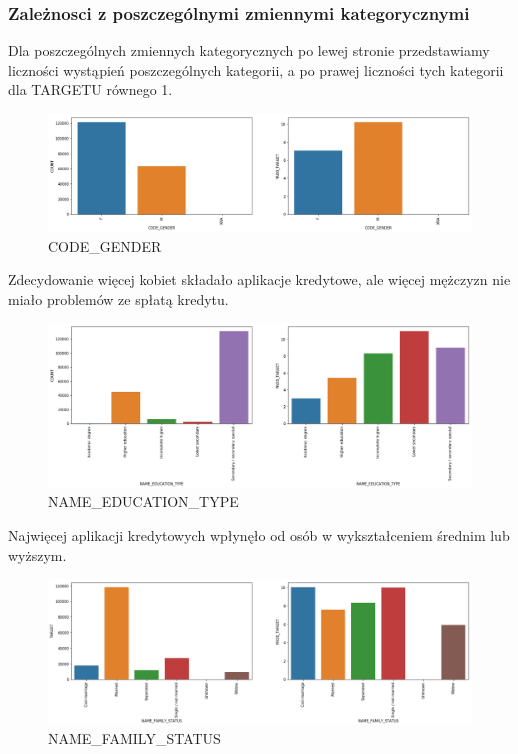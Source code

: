 \documentclass[12pt]{article}
\begin{document}
\FloatBarrier

\newpage
\subsubsection{Zależnosci z poszczególnymi zmiennymi kategorycznymi}

Dla poszczególnych zmiennych kategorycznych po lewej stronie przedstawiamy liczności wystąpień poszczególnych kategorii, a po prawej liczności tych kategorii dla TARGETU równego 1.




\begin{figure}[h!]
\centering
\includegraphics[scale=0.35]{gender.png}
\caption{CODE\_GENDER}
\end{figure}


Zdecydowanie więcej kobiet składało aplikacje kredytowe, ale więcej mężczyzn nie miało problemów ze spłatą kredytu.


\begin{figure}[h!]
\centering
\includegraphics[scale=0.35]{education.png}
\caption{NAME\_EDUCATION\_TYPE}
\end{figure}

Najwięcej aplikacji kredytowych wpłynęło od osób w wykształceniem średnim lub wyższym.

\newpage

\begin{figure}[h!]
\centering
\includegraphics[scale=0.35]{family.png}
\caption{NAME\_FAMILY\_STATUS}
\end{figure}
\end{document}
